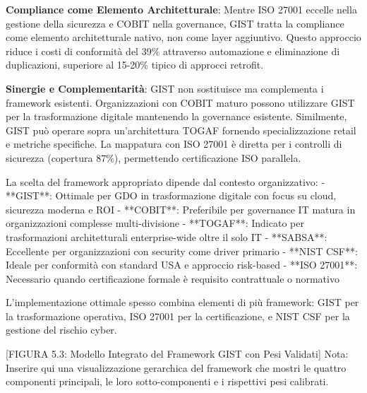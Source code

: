 \textbf{Compliance come Elemento Architetturale}: Mentre ISO 27001 eccelle nella gestione della sicurezza e COBIT nella governance, GIST tratta la compliance come elemento architetturale nativo, non come layer aggiuntivo. Questo approccio riduce i costi di conformità del 39\% attraverso automazione e eliminazione di duplicazioni, superiore al 15-20\% tipico di approcci retrofit.

\textbf{Sinergie e Complementarità}: GIST non sostituisce ma complementa i framework esistenti. Organizzazioni con COBIT maturo possono utilizzare GIST per la trasformazione digitale mantenendo la governance esistente. Similmente, GIST può operare sopra un'architettura TOGAF fornendo specializzazione retail e metriche specifiche. La mappatura con ISO 27001 è diretta per i controlli di sicurezza (copertura 87\%), permettendo certificazione ISO parallela.

La scelta del framework appropriato dipende dal contesto organizzativo:
- **GIST**: Ottimale per GDO in trasformazione digitale con focus su cloud, sicurezza moderna e ROI
- **COBIT**: Preferibile per governance IT matura in organizzazioni complesse multi-divisione
- **TOGAF**: Indicato per trasformazioni architetturali enterprise-wide oltre il solo IT
- **SABSA**: Eccellente per organizzazioni con security come driver primario
- **NIST CSF**: Ideale per conformità con standard USA e approccio risk-based
- **ISO 27001**: Necessario quando certificazione formale è requisito contrattuale o normativo

L'implementazione ottimale spesso combina elementi di più framework: GIST per la trasformazione operativa, ISO 27001 per la certificazione, e NIST CSF per la gestione del rischio cyber.

[FIGURA 5.3: Modello Integrato del Framework GIST con Pesi Validati]
Nota: Inserire qui una visualizzazione gerarchica del framework che mostri le quattro componenti principali, le loro sotto-componenti e i rispettivi pesi calibrati.

